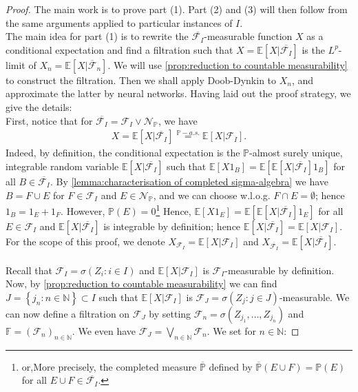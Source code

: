\documentclass[11pt]{report}
\theoremstyle{plain} %
\theoremstyle{definition} %
\theoremstyle{remark} %
\begin{document}
\begin{proof}   
The main work is to prove part (1). Part (2) and (3) will then follow from the same arguments applied to particular instances of \(I\). \\
The main idea for part (1) is to rewrite the \(\overline{\mathcal{F}_I}\)-measurable function \(X\) as a conditional expectation and find a filtration such that \(X=\mathbb{E}[X|\overline{\mathcal{F}_I}]\) is the \(L^p\)-limit of \(X_n=\mathbb{E}[X|\overline{\mathcal{F}}_n]\). We will use \cref{prop:reduction to countable measurability} to construct the filtration. Then we shall apply Doob-Dynkin to \(X_n\), and approximate the latter by neural networks. Having laid out the proof strategy, we give the details:\\
First, notice that for \(\overline{\mathcal{F}_I}=\mathcal{F}_I\vee\mathcal{N}_{\mathbb{P}}\), we have
\begin{align}
    X=\mathbb{E}[X|\overline{\mathcal{F}_I}]\overset{\mathbb{P}-a.s.}{=}\mathbb{E}[X|\mathcal{F}_I]. 
\end{align}
Indeed, by definition, the conditional expectation is the \(\mathbb{P}\)-almost surely unique, integrable random variable \(\mathbb{E}[X|\overline{\mathcal{F}_I}]\) such that \(\mathbb{E}[X1_B]=\mathbb{E}[\mathbb{E}[X|\overline{\mathcal{F}_I}]1_B]\) for all \(B\in\overline{\mathcal{F}_I}\). By \cref{lemma:characterisation of completed sigma-algebra} we have \(B=F\cup E\) for \(F\in\mathcal{F}_I\) and \(E\in\mathcal{N}_{\mathbb{P}}\), and we can choose w.l.o.g. \(F\cap E=\emptyset\); hence \(1_{B}=1_E+1_F\). However, \(\mathbb{P}(E)=0\)\footnote{ or,More precisely, the completed measure \(\overline{\mathbb{P}}\) defined by \(\overline{\mathbb{P}}(E\cup F)=\mathbb{P}(E)\) for all \(E\cup F\in\overline{\mathcal{F}_I}\).} Hence, \(\mathbb{E}[X1_E]=\mathbb{E}[\mathbb{E}[X|\overline{\mathcal{F}_I}]1_E]\) for all \(E\in\mathcal{F}_I\) and \(\mathbb{E}[X|\overline{\mathcal{F}_I}]\) is integrable by definition; hence \(\mathbb{E}[X|\overline{\mathcal{F}_I}]=\mathbb{E}[X|\mathcal{F}_I]\). For the scope of this proof, we denote \(X_{\mathcal{F}_I}=\mathbb{E}[X|\mathcal{F}_I]\) and \(X_{\overline{\mathcal{F}_I}}=\mathbb{E}[X|\overline{\mathcal{F}_I}]\).
\\\\
Recall that \(\mathcal{F}_I=\sigma(Z_i:i\in I)\) and \(\mathbb{E}[X|\mathcal{F}_I]\) is \(\mathcal{F}_I\)-measurable by definition. 
Now, by \cref{prop:reduction to countable measurability} we can find \(J= \left\{j_n:n\in\mathbb{N}\right\}\subset I\) such that \(\mathbb{E}[X|\mathcal{F}_I]\) is \(\mathcal{F}_J=\sigma(Z_j:j\in J)\)-measurable. We can now define a filtration on \(\mathcal{F}_J\) by setting \(\mathcal{F}_n=\sigma(Z_{j_1},\dots,Z_{j_n})\) and \(\mathbb{F}=(\mathcal{F}_{n})_{n\in\mathbb{N}}\). We even have \(\mathcal{F}_J=\bigvee_{n\in\mathbb{N}}\mathcal{F}_n\). We set for \(n\in\mathbb{N}\):

\end{proof}
\end{document}
